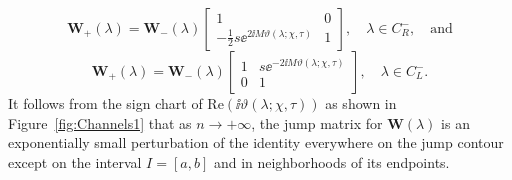 \begin{equation}
\mathbf{W}_+(\lambda)=\mathbf{W}_-(\lambda)\begin{bmatrix}1 & 0\\
-\tfrac{1}{2}s\ee^{2\ii M\vartheta(\lambda;\chi,\tau)} & 1\end{bmatrix},\quad
\lambda\in C_R^-,\quad\text{and}
\label{eq:Tjump-channels-CRminus-ALT}
\end{equation}
\begin{equation}
\mathbf{W}_+(\lambda)=\mathbf{W}_-(\lambda)\begin{bmatrix} 1 & s\ee^{-2\ii M\vartheta(\lambda;\chi,\tau)}\\ 0 & 1\end{bmatrix},\quad\lambda\in C_L^-.
\label{eq:Tjump-channels-CLminus-ALT}
\end{equation}
It follows from the sign chart of $\mathrm{Re}(\ii\vartheta(\lambda;\chi,\tau))$ as shown in Figure~\ref{fig:Channels1} that as $n\to+\infty$, the jump matrix for $\mathbf{W}(\lambda)$ is an exponentially small perturbation of the identity everywhere on the jump contour except on the interval $I=[a,b]$ and in neighborhoods of its endpoints.  

